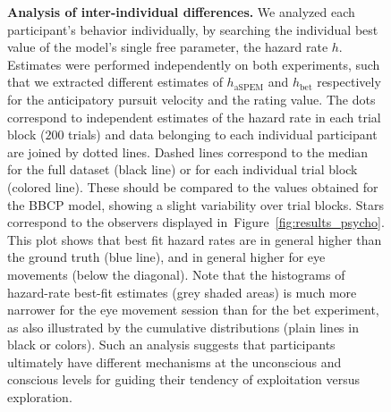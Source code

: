 \documentclass[10pt,letterpaper]{article}
\newcommand{\seeFig}[1]{Figure~\ref{fig:#1}}
\begin{document}
\begin{figure}
\caption{\textbf{Analysis of inter-individual differences.} %
We analyzed each participant's behavior individually, by searching
the individual best value of the model's single free parameter, the hazard rate $h$.
Estimates were performed independently on both experiments,
such that we extracted different estimates of $h_{\text{aSPEM}}$ and $h_{\text{bet}}$
respectively for the anticipatory pursuit velocity and the rating value.
The dots correspond to independent estimates of the hazard rate
in each trial block ($200$ trials) and data belonging to
each individual participant are joined by dotted lines.
Dashed lines correspond to the median for the full dataset (black line)
or for each individual trial block (colored line).
These should be compared to the values obtained for the BBCP model,
showing a slight variability over trial blocks.
Stars correspond to the observers displayed in~\seeFig{results_psycho}.
This plot shows that best fit hazard rates are in general higher than the ground truth (blue line),
and in general higher for eye movements (below the diagonal).
Note that the histograms of hazard-rate best-fit estimates (grey shaded areas) is much more narrower
for the eye movement session than for the bet experiment,
as also illustrated by the cumulative distributions (plain lines in black or colors).
Such an analysis suggests that participants ultimately have
different mechanisms at the unconscious and conscious levels
for guiding their tendency of exploitation versus exploration.
}
\label{fig:results_inter}
\end{figure}
\end{document}
